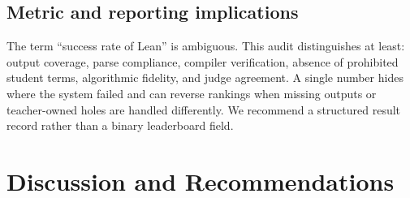\documentclass{article}
\begin{document}
\subsection{Metric and reporting implications}

The term ``success rate of Lean'' is ambiguous.  This audit distinguishes at least:
output coverage, parse compliance, compiler verification, absence of prohibited
student terms, algorithmic fidelity, and judge agreement.  A single number hides where
the system failed and can reverse rankings when missing outputs or teacher-owned holes
are handled differently.  We recommend a structured result record rather than a binary
leaderboard field.

\section{Discussion and Recommendations}
\end{document}
